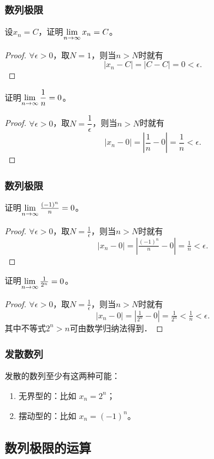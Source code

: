 \documentclass[14pt,notheorems,leqno,xcolor={rgb}]{beamer} %
\begin{document}
\begin{iframe}
\frametitle{数列极限}
\begin{example*}
设$x_n=C$，证明$\lim\limits_{n\to\infty}x_n= C$。
\end{example*}
\pause
\begin{proof}
$\forall\epsilon>0$，取$N=1$，则当$n>N$时就有
\[ |x_n-C|=\left|C-C\right|=0<\epsilon.\]
\end{proof}
\pause
\begin{example*}
证明$\lim\limits_{n\to\infty}\dfrac{1}{n}= 0$。
\end{example*}
\pause
\begin{proof}
$\forall\epsilon>0$，取$N=\dfrac1\epsilon$，则当$n>N$时就有
\[ |x_n-0|=\left|\dfrac{1}{n}-0\right|=\frac1n<\epsilon.\]
\end{proof}
\end{iframe}

\begin{iframe}
\frametitle{数列极限}
\begin{example*}
证明$\lim\limits_{n\to\infty}\frac{(-1)^n}{n}= 0$。
\end{example*}
\pause
\begin{proof}
$\forall\epsilon>0$，取$N=\frac1\epsilon$，则当$n>N$时就有
\[ |x_n-0|=\left|\tfrac{(-1)^n}{n}-0\right|=\tfrac1n<\epsilon.\]
\end{proof}
\pause
\begin{example*}
证明$\lim\limits_{n\to\infty}\frac1{2^n}= 0$。
\end{example*}
\pause
\begin{proof}
$\forall\epsilon>0$，取$N=\frac1\epsilon$，则当$n>N$时就有
\[ |x_n-0|=\left|\tfrac1{2^n}-0\right|=\tfrac1{2^n}<\tfrac1n<\epsilon.\]
其中不等式$2^n>n$可由数学归纳法得到．
\end{proof}
\end{iframe}

\begin{frame}
\frametitle{发散数列}
发散的数列至少有这两种可能：
\begin{enumerate}
  \item 无界型的：比如 $x_n=2^n$；
  \item 摆动型的：比如 $x_n=(-1)^n$。
\end{enumerate}
\end{frame}

\subsection{数列极限的运算}
\end{document}
